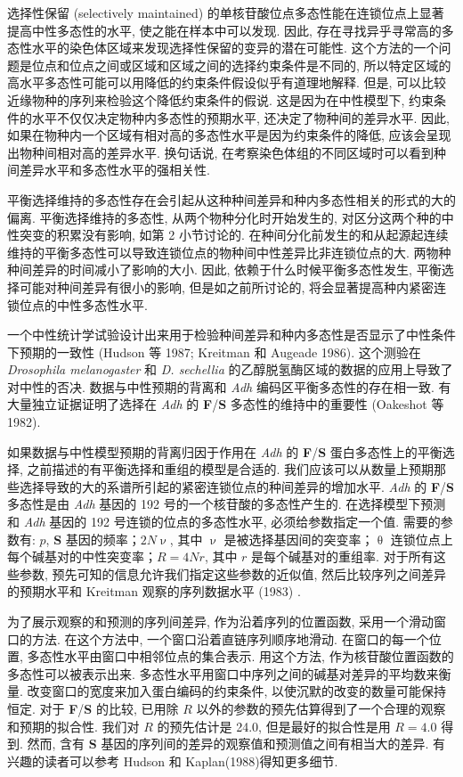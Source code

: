 \documentclass[12pt]{article}
\begin{document}
选择性保留 (selectively maintained) 的单核苷酸位点多态性能在连锁位点上显著提高中性多态性的水平,
使之能在样本中可以发现. 因此, 存在寻找异乎寻常高的多态性水平的染色体区域来发现选择性保留的变异的潜在可能性.
这个方法的一个问题是位点和位点之间或区域和区域之间的选择约束条件是不同的,
所以特定区域的高水平多态性可能可以用降低的约束条件假设似乎有道理地解释. 但是,
可以比较近缘物种的序列来检验这个降低约束条件的假说. 这是因为在中性模型下, 约束条件的水平不仅仅决定物种内多态性的预期水平,
还决定了物种间的差异水平. 因此, 如果在物种内一个区域有相对高的多态性水平是因为约束条件的降低,
应该会呈现出物种间相对高的差异水平. 换句话说, 在考察染色体组的不同区域时可以看到种间差异水平和多态性水平的强相关性.

平衡选择维持的多态性存在会引起从这种种间差异和种内多态性相关的形式的大的偏离. 平衡选择维持的多态性,
从两个物种分化时开始发生的, 对区分这两个种的中性突变的积累没有影响, 如第 2 小节讨论的.
在种间分化前发生的和从起源起连续维持的平衡多态性可以导致连锁位点的物种间中性差异比非连锁位点的大.
两物种种间差异的时间减小了影响的大小. 因此, 依赖于什么时候平衡多态性发生, 平衡选择可能对种间差异有很小的影响,
但是如之前所讨论的, 将会显著提高种内紧密连锁位点的中性多态性水平.

一个中性统计学试验设计出来用于检验种间差异和种内多态性是否显示了中性条件下预期的一致性 (Hudson 等 1987; Kreitman 和
Augeade 1986). 这个测验在 \textit{Drosophila melanogaster} 和 \textit{D.
sechellia} 的乙醇脱氢酶区域的数据的应用上导致了对中性的否决.
数据与中性预期的背离和 \textit{Adh} 编码区平衡多态性的存在相一致.
有大量独立证据证明了选择在 \textit{Adh} 的 \textbf{F}/\textbf{S} 多态性的维持中的重要性 (Oakeshot 等 1982).

如果数据与中性模型预期的背离归因于作用在 \textit{Adh} 的 \textbf{F}/\textbf{S} 蛋白多态性上的平衡选择,
之前描述的有平衡选择和重组的模型是合适的.
我们应该可以从数量上预期那些选择导致的大的系谱所引起的紧密连锁位点的种间差异的增加水平.
\textit{Adh} 的 \textbf{F}/\textbf{S} 多态性是由 \textit{Adh} 基因的 192 号的一个核苷酸的多态性产生的.
在选择模型下预测和 \textit{Adh} 基因的 192 号连锁的位点的多态性水平, 必须给参数指定一个值. 需要的参数有: $p$,
\textbf{S} 基因的频率；$2N\upnu$, 其中 $\upnu$ 是被选择基因间的突变率；$\uptheta$
连锁位点上每个碱基对的中性突变率；$R=4Nr$, 其中 $r$ 是每个碱基对的重组率. 对于所有这些参数,
预先可知的信息允许我们指定这些参数的近似值, 然后比较序列之间差异的预期水平和 Kreitman 观察的序列数据水平 (1983) .

为了展示观察的和预测的序列间差异, 作为沿着序列的位置函数, 采用一个滑动窗口的方法. 在这个方法中,
一个窗口沿着直链序列顺序地滑动. 在窗口的每一个位置, 多态性水平由窗口中相邻位点的集合表示. 用这个方法,
作为核苷酸位置函数的多态性可以被表示出来. 多态性水平用窗口中序列之间的碱基对差异的平均数来衡量.
改变窗口的宽度来加入蛋白编码的约束条件, 以使沉默的改变的数量可能保持恒定. 对于 \textbf{F}/\textbf{S} 的比较, 已用除 $R$
以外的参数的预先估算得到了一个合理的观察和预期的拟合性. 我们对 $R$ 的预先估计是 24.0, 但是最好的拟合性是用 $R=4.0$
得到. 然而, 含有 \textbf{S} 基因的序列间的差异的观察值和预测值之间有相当大的差异. 有兴趣的读者可以参考 Hudson 和
Kaplan(1988)得知更多细节.
\end{document}
